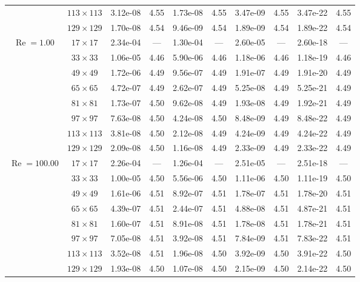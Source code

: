 \documentclass[preprint, 12pt]{elsarticle}
\begin{document}
\begin{center}
\begin{table}[H]
{\begin{tabular*}{\textwidth}{@{\extracolsep\fill}cccccccccc@{}}
    & $113\times 113$ & 3.12e-08 & 4.55 & 1.73e-08 & 4.55 & 3.47e-09 & 4.55 & 3.47e-22 & 4.55 \\
    & $129\times 129$ & 1.70e-08 & 4.54 & 9.46e-09 & 4.54 & 1.89e-09 & 4.54 & 1.89e-22 & 4.54 \\
    \hline\hline
    \multirow{7}{*}{$\operatorname{Re}=1.00$} & $17\times 17$ & 2.34e-04 & --- & 1.30e-04 & --- & 2.60e-05 & --- & 2.60e-18 & --- \\
    & $33\times 33$ & 1.06e-05 & 4.46 & 5.90e-06 & 4.46 & 1.18e-06 & 4.46 & 1.18e-19 & 4.46 \\
    & $49\times 49$ & 1.72e-06 & 4.49 & 9.56e-07 & 4.49 & 1.91e-07 & 4.49 & 1.91e-20 & 4.49 \\
    \multirow{3}{*}{$\operatorname{Wi}=10$} & $65\times 65$ & 4.72e-07 & 4.49 & 2.62e-07 & 4.49 & 5.25e-08 & 4.49 & 5.25e-21 & 4.49 \\
    & $81\times 81$ & 1.73e-07 & 4.50 & 9.62e-08 & 4.49 & 1.93e-08 & 4.49 & 1.92e-21 & 4.49 \\
    & $97\times 97$ & 7.63e-08 & 4.50 & 4.24e-08 & 4.50 & 8.48e-09 & 4.49 & 8.48e-22 & 4.49 \\
    & $113\times 113$ & 3.81e-08 & 4.50 & 2.12e-08 & 4.49 & 4.24e-09 & 4.49 & 4.24e-22 & 4.49 \\
    & $129\times 129$ & 2.09e-08 & 4.50 & 1.16e-08 & 4.49 & 2.33e-09 & 4.49 & 2.33e-22 & 4.49 \\
    \hline
    \multirow{7}{*}{$\operatorname{Re}=100.00$} & $17\times 17$ & 2.26e-04 & --- & 1.26e-04 & --- & 2.51e-05 & --- & 2.51e-18 & --- \\
    & $33\times 33$ & 1.00e-05 & 4.50 & 5.56e-06 & 4.50 & 1.11e-06 & 4.50 & 1.11e-19 & 4.50 \\
    & $49\times 49$ & 1.61e-06 & 4.51 & 8.92e-07 & 4.51 & 1.78e-07 & 4.51 & 1.78e-20 & 4.51 \\
    \multirow{3}{*}{$\operatorname{Wi}=10$} & $65\times 65$ & 4.39e-07 & 4.51 & 2.44e-07 & 4.51 & 4.88e-08 & 4.51 & 4.87e-21 & 4.51 \\
    & $81\times 81$ & 1.60e-07 & 4.51 & 8.91e-08 & 4.51 & 1.78e-08 & 4.51 & 1.78e-21 & 4.51 \\
    & $97\times 97$ & 7.05e-08 & 4.51 & 3.92e-08 & 4.51 & 7.84e-09 & 4.51 & 7.83e-22 & 4.51 \\
    & $113\times 113$ & 3.52e-08 & 4.51 & 1.96e-08 & 4.50 & 3.92e-09 & 4.50 & 3.91e-22 & 4.50 \\
    & $129\times 129$ & 1.93e-08 & 4.50 & 1.07e-08 & 4.50 & 2.15e-09 & 4.50 & 2.14e-22 & 4.50 \\

\end{tabular*}}
\end{table}
\end{center}
\end{document}
